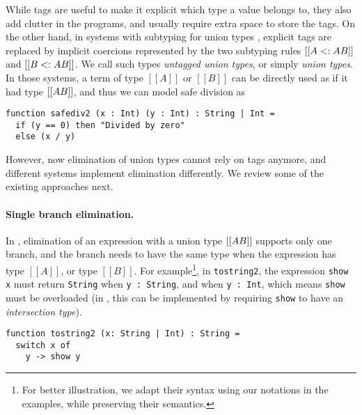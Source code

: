 

While tags are useful to make it explicit which type a value belongs to, they
also add clutter in the programs, and usually require extra space to store the
tags. On the other hand, in systems with subtyping for union types
\cite{dunfield2014elaborating,pierce1991programming,muehlboeck2018empowering},
explicit tags are replaced by implicit coercions represented by the two
subtyping rules $[[A <: A \/ B]]$ and $[[B <: A \/ B]]$. We call such types
\textit{untagged union types}, or simply \textit{union types}. In those systems,
a term of type $[[A]]$ or $[[B]]$ can be directly used as if it had type $[[A \/
B]]$, and thus we can model safe division as

\begin{lstlisting}
function safediv2 (x : Int) (y : Int) : String | Int =
  if (y == 0) then "Divided by zero"
  else (x / y)
\end{lstlisting}

\noindent However, now elimination of union types cannot rely on tags anymore, and
different systems implement elimination differently. We review some of the
existing approaches next.

\paragraph{Single branch elimination.}

In \citet{pierce1991programming,dunfield2014elaborating}, elimination of an
expression with a union type $[[A \/ B]]$ supports only one branch, and the
branch needs to have the same type when the expression has type $[[A]]$, or type
$[[B]]$. For example\footnote{For better illustration, we adapt their syntax
  using our notations in the examples, while preserving their semantics.}, in
\lstinline{tostring2}, the expression \lstinline{show x} must return
\lstinline{String} when \lstinline{y : String}, and when \lstinline{y : Int},
which means \lstinline{show} must be overloaded (in
\citet{pierce1991programming,dunfield2014elaborating}, this can be implemented
by requiring \lstinline{show} to have an \textit{intersection type}).

\begin{lstlisting}
function tostring2 (x: String | Int) : String =
  switch x of
    y -> show y
\end{lstlisting}

